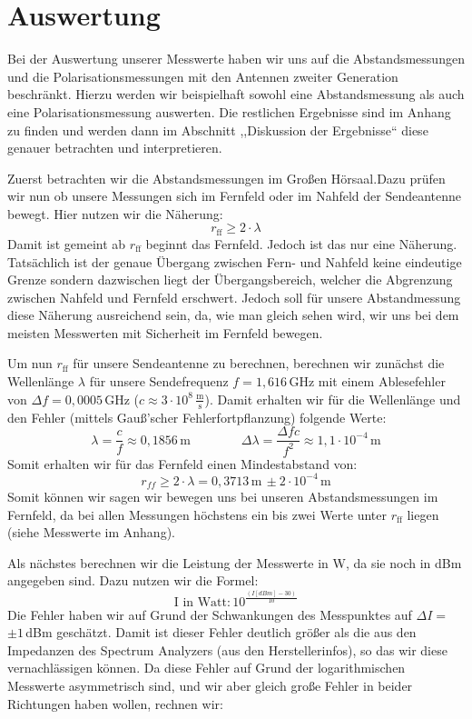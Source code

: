 \documentclass[titlepage,11pt,a4paper,ngerman]{article}
\newcommand{\tx}[1]{\textrm{#1}}
\begin{document}
\section{Auswertung}
Bei der Auswertung unserer Messwerte haben wir uns auf die Abstandsmessungen und die Polarisationsmessungen mit den Antennen zweiter Generation beschränkt. Hierzu werden wir beispielhaft sowohl eine Abstandsmessung als auch eine Polarisationsmessung auswerten. Die restlichen Ergebnisse sind im Anhang zu finden und werden dann im Abschnitt  ,,Diskussion der Ergebnisse`` diese genauer betrachten und interpretieren. \par 
Zuerst betrachten wir die Abstandsmessungen im Großen Hörsaal.Dazu prüfen wir nun ob unsere Messungen sich im Fernfeld oder im Nahfeld der Sendeantenne bewegt. Hier nutzen wir die Näherung:
\begin{equation}
r_{\tx{ff}} \geqslant 2\cdot\lambda
\end{equation}
Damit ist gemeint ab $r_{\tx{ff}}$ beginnt das Fernfeld. Jedoch ist das nur eine Näherung. Tatsächlich ist der genaue Übergang zwischen Fern- und Nahfeld keine eindeutige Grenze sondern dazwischen liegt der Übergangsbereich, welcher die Abgrenzung zwischen Nahfeld und Fernfeld erschwert. Jedoch soll für unsere Abstandmessung diese Näherung ausreichend sein, da, wie man gleich sehen wird, wir uns bei dem meisten Messwerten mit Sicherheit im Fernfeld bewegen. \par 
Um nun $r_{\tx{ff}}$ für unsere Sendeantenne zu berechnen, berechnen wir zunächst die Wellenlänge $\lambda$ für unsere Sendefrequenz $f=1{,}616\,$GHz mit einem Ablesefehler von $\Delta f=0{,}0005\,$GHz ($c\approx 3\cdot10^{8}\,\frac{\tx{m}}{\tx{s}}$). Damit erhalten wir für die Wellenlänge und den Fehler (mittels Gauß'scher Fehlerfortpflanzung) folgende Werte:
\begin{equation*}
\lambda = \frac{c}{f} \approx 0{,}1856\,\tx{m} \qquad \qquad
\Delta \lambda = \frac{\Delta f c}{f^{2}} \approx 1{,}1 \cdot 10^{-4}\,\tx{m}
\end{equation*}
Somit erhalten wir für das Fernfeld einen Mindestabstand von: 
\begin{equation*}
r_{ff} \geqslant 2\cdot\lambda = 0{,}3713\,\tx{m}\, \pm 2\cdot10^{-4}\,\tx{m}
\end{equation*}
Somit können wir sagen wir bewegen uns bei unseren Abstandsmessungen im Fernfeld, da bei allen Messungen höchstens ein bis zwei Werte unter $r_{\tx{ff}}$ liegen (siehe Messwerte im Anhang). \par 
Als nächstes berechnen wir die Leistung der Messwerte in W, da sie noch in dBm angegeben sind. Dazu nutzen wir die Formel:
\begin{equation}
\tx{I in Watt}: 10^{\frac{(I[dBm]-30)}{10}}
\end{equation}
Die Fehler haben wir auf Grund der Schwankungen des Messpunktes auf $\Delta I=$$\pm 1\,$dBm geschätzt. Damit ist dieser Fehler deutlich größer als die aus den Impedanzen des Spectrum Analyzers (aus den Herstellerinfos), so das wir diese vernachlässigen können. Da diese Fehler auf Grund der logarithmischen Messwerte asymmetrisch sind, und wir aber gleich große Fehler in beider Richtungen haben wollen, rechnen wir:




\end{document}
